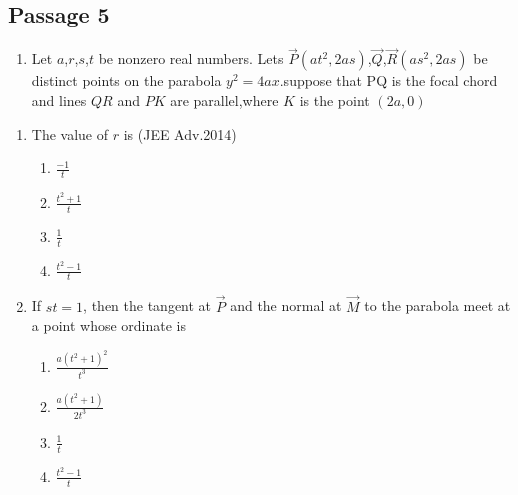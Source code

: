 \subsection*{Passage 5}
\begin{enumerate}
\item[] Let $a$,$r$,$s$,$t$ be nonzero real numbers. Lets $\Vec{P}$$(at^2,2as)$,$\Vec{Q}$,$\Vec{R}$$(as^2,2as)$ be distinct points on the parabola $y^2=4ax$.suppose that PQ is the focal chord and lines $QR$ and $PK$ are parallel,where $K$ is the point $(2a,0)$
\end{enumerate}
\begin{enumerate}
\item The value of $r$ is 
\hfill(JEE Adv.2014)
\begin{enumerate}
    \item $\frac{-1}{t}$ 
    \item $\frac{t^2+1}{t}$
    \item $\frac{1}{t}$
    \item $\frac{t^2-1}{t}$
\end{enumerate}
\item If $st=1$, then the tangent at $\Vec{P}$ and the normal at $\Vec{M}$ to the
parabola meet at a point whose ordinate is 
\begin{enumerate}
    \item $\frac{a(t^2+1)^2}{t^3}$
    \item $\frac{a(t^2+1)}{2t^3}$
    \item $\frac{1}{t}$
    \item $\frac{t^2-1}{t}$
    \end{enumerate}
\end{enumerate}
